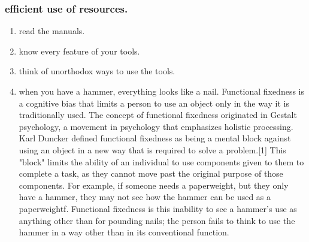 \documentclass[11pt]{article}
\begin{document}
\subsubsection{efficient use of resources.}
\label{sec:org6b4c8e8}
\begin{enumerate}
\item read the manuals.
\label{sec:orge0b76b9}
\item know every feature of your tools.
\label{sec:orga904e83}
\item think of unorthodox ways to use the tools.
\label{sec:org513b0d2}
\item when you have a hammer, everything looks like a nail.
\label{sec:org7a759cb}
Functional fixedness is a cognitive bias that limits a person to use an object only in the way it is traditionally used. The concept of functional fixedness originated in Gestalt psychology, a movement in psychology that emphasizes holistic processing. Karl Duncker defined functional fixedness as being a mental block against using an object in a new way that is required to solve a problem.[1] This "block" limits the ability of an individual to use components given to them to complete a task, as they cannot move past the original purpose of those components. For example, if someone needs a paperweight, but they only have a hammer, they may not see how the hammer can be used as a paperweightf. Functional fixedness is this inability to see a hammer's use as anything other than for pounding nails; the person fails to think to use the hammer in a way other than in its conventional function.
\end{enumerate}
\end{document}

